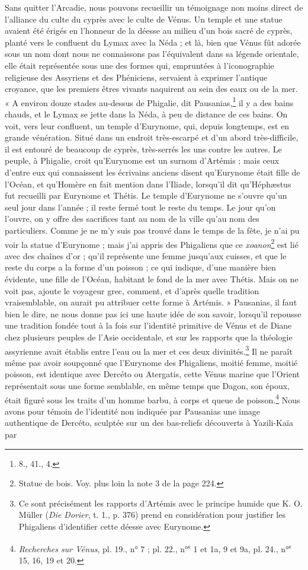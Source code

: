 \documentclass{article}
\begin{document}
Sans quitter l'Arcadie, nous pouvons recueillir un témoignage non moins direct de l'alliance du culte du cyprès avec le culte de Vénus. Un temple et une statue avaient été érigés en l'honneur de la déesse au milieu d'un bois sacré de cyprès, planté vers le confluent du Lymax avec la Néda ; et là, bien que Vénus fût adorée sous un nom dont nous ne connaissons pas l'équivalent dans sa légende orientale, elle était représentée sous une des formes qui, empruntées à l'iconographie religieuse des Assyriens et des Phéniciens, servaient à exprimer l'antique croyance, que les premiers êtres vivants naquirent au sein des eaux ou de la mer. « A environ douze stades au-dessus de Phigalie, dit Pausanias,\footnote{8., 41., 4.} il y a des bains chauds, et le Lymax se jette dans la Néda, à peu de distance de ces bains. On voit, vers leur confluent, un temple d'Eurynome, qui, depuis longtemps, est en grande vénération. Situé dans un endroit très-escarpé et d'un abord très-difficile, il est entouré de beaucoup de cyprès, très-serrés les uns contre les autres. Le peuple, à Phigalie, croit qu'Eurynome est un surnom d'Artémis ; mais ceux d'entre eux qui connaissent les écrivains anciens disent qu'Eurynome était fille de l'Océan, et qu'Homère en fait mention dans l'Iliade, lorsqu'il dit qu'Héphæstus fut recueilli par Eurynome et Thétis. Le temple d'Eurynome ne s'ouvre qu'un seul jour dans l'année ; il reste fermé tout le reste du temps. Le jour qu'on l'ouvre, on y offre des sacrifices tant au nom de la ville qu'au nom des particuliers. Comme je ne m'y suis pas trouvé dans le temps de la fête, je n'ai pu voir la statue d'Eurynome ; mais j'ai appris des Phigaliens que ce \emph{xoanon}\footnote{Statue de bois. Voy. plus loin la note 3 de la page 224.} est lié avec des chaînes d'or ; qu'il représente une femme jusqu'aux cuisses, et que le reste du corps a la forme d'un poisson ; ce qui indique, d'une manière bien évidente, une fille de l'Océan, habitant le fond de la mer avec Thétis. Mais on ne voit pas, ajoute le voyageur grec, comment, et d'après quelle tradition vraisemblable, on aurait pu attribuer cette forme à Artémis. » Pausanias, il faut bien le dire, ne nous donne pas ici une haute idée de son savoir, lorsqu'il repousse une tradition fondée tout à la fois sur l'identité primitive de Vénus et de Diane chez plusieurs peuples de l'Asie occidentale, et sur les rapports que la théologie assyrienne avait établis entre l'eau ou la mer et ces deux divinités.\footnote{Ce sont précisément les rapports d'Artémis avec le principe humide que K. O. Müller (\emph{Die Dorier}, t. 1., p. 376) prend en considération pour justifier les Phigaliens d'identifier cette déesse avec Eurynome.} Il ne paraît même pas avoir soupçonné que l'Eurynome des Phigaliens, moitié femme, moitié poisson, est identique avec Dercéto ou Atergatis, cette Vénus marine que l'Orient représentait sous une forme semblable, en même temps que Dagon, son époux, était figuré sous les traits d'un homme barbu, à corps et queue de poisson.\footnote{\emph{Recherches sur Vénus}, pl. 19., n° 7 ; pl. 22., n°\textsuperscript{s} 1 et 1a, 9 et 9a, pl. 24., n°\textsuperscript{s} 15, 16, 19 et 20.} Nous avons pour témoin de l'identité non indiquée par Pausanias une image authentique de Dercéto, sculptée sur un des bas-reliefs découverts à Yazili-Kaïa par 
\end{document}
